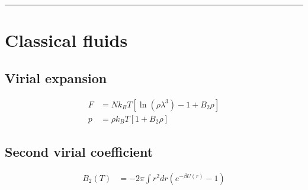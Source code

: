 \noindent\rule[1ex]{\textwidth/5}{1pt}
\section{Classical fluids}

\subsection*{Virial expansion}

\begin{equation*}
    \begin{aligned}
        F &= N k_B T \left[\ln(\rho \lambda^3)-1+B_2\rho\right] \\
        p &= \rho k_B T \left[1 + B_2 \rho\right]
    \end{aligned}
\end{equation*}

\subsection*{Second virial coefficient}

\begin{equation*}
    \begin{aligned}
        B_2(T) &= -2 \pi \int r^2 dr \left(e^{-\beta U(r)} -1\right)
    \end{aligned}
\end{equation*}